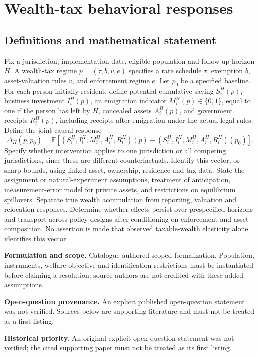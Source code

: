\documentclass[11pt]{article}
\begin{document}
\section*{Wealth-tax behavioral responses}\label{30007754}
\subsection{Definitions and mathematical statement}
Fix a jurisdiction, implementation date, eligible population and follow-up horizon \(H\). A wealth-tax regime \(p=(\tau,b,v,e)\) specifies a rate schedule \(\tau\), exemption \(b\), asset-valuation rules \(v\), and enforcement regime \(e\). Let \(p_0\) be a specified baseline. For each person initially resident, define potential cumulative saving \(S_i^H(p)\), business investment \(I_i^H(p)\), an emigration indicator \(M_i^H(p)\in\{0,1\}\), equal to one if the person has left by \(H\), concealed assets \(A_i^H(p)\), and government receipts \(R_i^H(p)\), including receipts after emigration under the actual legal rules. Define the joint causal response
\[\Delta_H(p,p_0)=\mathbb E[(S_i^H,I_i^H,M_i^H,A_i^H,R_i^H)(p)-(S_i^H,I_i^H,M_i^H,A_i^H,R_i^H)(p_0)].\]
Specify whether intervention applies to one jurisdiction or all competing jurisdictions, since these are different counterfactuals. Identify this vector, or sharp bounds, using linked asset, ownership, residence and tax data. State the assignment or natural-experiment assumptions, treatment of anticipation, measurement-error model for private assets, and restrictions on equilibrium spillovers. Separate true wealth accumulation from reporting, valuation and relocation responses. Determine whether effects persist over prespecified horizons and transport across policy designs after conditioning on enforcement and asset composition. No assertion is made that observed taxable-wealth elasticity alone identifies this vector.

\par\textbf{Formulation and scope.} Catalogue-authored scoped formalization. Population, instruments, welfare objective and identification restrictions must be instantiated before claiming a resolution; source authors are not credited with these added assumptions.

\par\textbf{Open-question provenance.} An explicit published open-question statement was not verified. Sources below are supporting literature and must not be treated as a first listing.

\par\textbf{Historical priority.} An original explicit open-question statement was not verified; the cited supporting paper must not be treated as its first listing.
\end{document}
